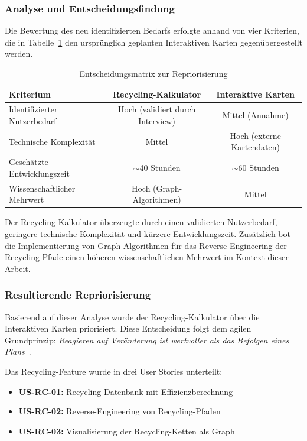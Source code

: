 \subsubsection{Analyse und Entscheidungsfindung}

Die Bewertung des neu identifizierten Bedarfs erfolgte anhand von vier Kriterien, die in Tabelle~\ref{tab:repriorisierung} den ursprünglich geplanten Interaktiven Karten gegenübergestellt werden.

\begin{table}[htbp]
\centering
\caption{Entscheidungsmatrix zur Repriorisierung}
\label{tab:repriorisierung}
\begin{tabular}{lcc}
\toprule
\textbf{Kriterium} & \textbf{Recycling-Kalkulator} & \textbf{Interaktive Karten} \\
\midrule
Identifizierter Nutzerbedarf & Hoch (validiert durch Interview) & Mittel (Annahme) \\
Technische Komplexität & Mittel & Hoch (externe Kartendaten) \\
Geschätzte Entwicklungszeit & $\sim$40 Stunden & $\sim$60 Stunden \\
Wissenschaftlicher Mehrwert & Hoch (Graph-Algorithmen) & Mittel \\
\bottomrule
\end{tabular}
\end{table}

Der Recycling-Kalkulator überzeugte durch einen validierten Nutzerbedarf, geringere technische Komplexität und kürzere Entwicklungszeit. Zusätzlich bot die Implementierung von Graph-Algorithmen für das Reverse-Engineering der Recycling-Pfade einen höheren wissenschaftlichen Mehrwert im Kontext dieser Arbeit.

\subsubsection{Resultierende Repriorisierung}

Basierend auf dieser Analyse wurde der Recycling-Kalkulator über die Interaktiven Karten priorisiert. Diese Entscheidung folgt dem agilen Grundprinzip: \textit{\glqq Reagieren auf Veränderung ist wertvoller als das Befolgen eines Plans\grqq{}}~\cite{agilemanifesto2001}.

Das Recycling-Feature wurde in drei User Stories unterteilt:
\begin{itemize}
    \item \textbf{US-RC-01:} Recycling-Datenbank mit Effizienzberechnung
    \item \textbf{US-RC-02:} Reverse-Engineering von Recycling-Pfaden
    \item \textbf{US-RC-03:} Visualisierung der Recycling-Ketten als Graph
\end{itemize}

